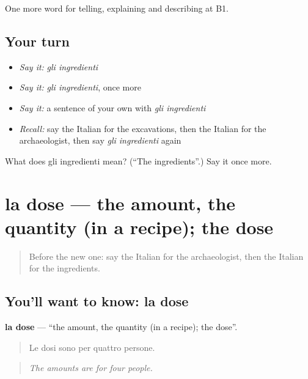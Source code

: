 \begin{grammarlens}[title={What you've built}]
One more word for telling, explaining and describing at B1.
\end{grammarlens}

\subsection*{Your turn}
\begin{itemize}
\raggedright
  \item \emph{Say it:} \emph{gli ingredienti}
  \item \emph{Say it:} \emph{gli ingredienti}, once more
  \item \emph{Say it:} a sentence of your own with \emph{gli ingredienti}
  \item \emph{Recall:} say the Italian for the excavations, then the Italian for the archaeologist, then say \emph{gli ingredienti} again
\end{itemize}

\begin{tcolorbox}[breakable,colback=teal!4,colframe=teal!35!black,title={Before you move on}]
What does gli ingredienti mean? (\textquotedblleft{}The ingredients\textquotedblright{}.) Say it once more.
\end{tcolorbox}
\section[la dose]{la dose — the amount, the quantity (in a recipe); the dose}

\label{lesson:IT-C331-dose}



\begin{quote}
Before the new one: say the Italian for the archaeologist, then the Italian for the ingredients.
\end{quote}

\subsection*{You'll want to know: la dose}
\textbf{la dose} — \textquotedblleft{}the amount, the quantity (in a recipe); the dose\textquotedblright{}.

\begin{quote}
Le dosi sono per quattro persone.
\end{quote}

\begin{quote}
\emph{The amounts are for four people.}
\end{quote}


